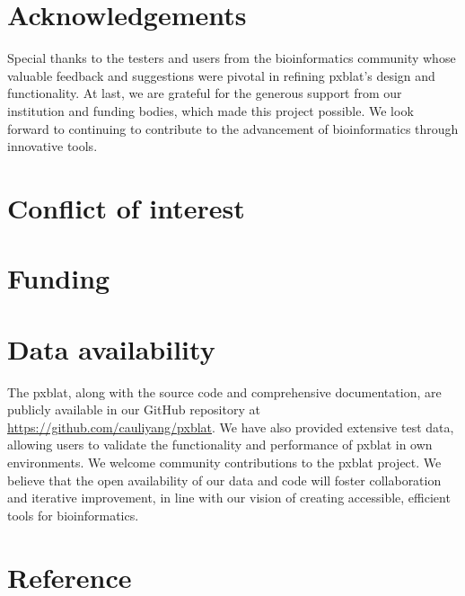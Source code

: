 \section*{Acknowledgements}\label{sec:acknowledgements}

Special thanks to the testers and users from the bioinformatics community whose valuable feedback and suggestions were pivotal in refining \gls{pxblat}'s design and functionality.
At last, we are grateful for the generous support from our institution and funding bodies, which made this project possible.
We look forward to continuing to contribute to the advancement of bioinformatics through innovative tools.

\section*{Conflict of interest}\label{sec:conflict-of-interest}


\section*{Funding}\label{sec:funding}


\section*{Data availability}\label{sec:data-availability}

The \gls{pxblat}, along with the source code and comprehensive documentation, are publicly available in our GitHub repository at \url{https://github.com/cauliyang/pxblat}.
We have also provided extensive test data, allowing users to validate the functionality and performance of \gls{pxblat} in own environments.
We welcome community contributions to the \gls{pxblat} project.
We believe that the open availability of our data and code will foster collaboration and iterative improvement, in line with our vision of creating accessible, efficient tools for bioinformatics.

\section*{Reference}\label{sec:reference}



